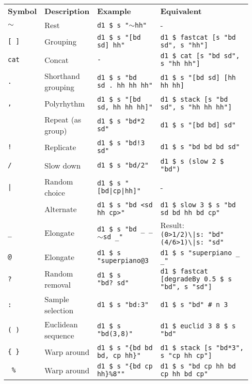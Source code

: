 \documentclass[8pt]{extarticle} %
\newcommand{\rest}{$\sim$}
\begin{document}
\begin{multicols}{2}
		{\small
		\begin{tabular}{L{0.1\linewidth} L{0.2\linewidth} L{0.27\linewidth} L{0.43\linewidth}}
			\small\bf Symbol & \small\bf Description & \small\bf Example & \small\bf Equivalent  \\ 
			\tt \rest   & Rest  & \tt d1 \$ s "\rest hh" & -	\\
			\tt [ ]   & Grouping & \tt d1 \$ s "[bd sd] hh" & \tt d1 \$ fastcat [s "bd sd", s "hh"] \\
			\tt cat & Concat & \tt - & \tt d1 \$ cat [s "bd sd", s "hh hh"] \\
			\tt . & Shorthand grouping & \tt d1 \$ s "bd sd\,.\,hh hh hh" & \tt d1 \$ s "[bd sd] [hh hh hh] \\
			\tt , & Polyrhythm  & \tt d1 \$ s "[bd sd, hh hh hh]" & \tt d1 \$ stack [s "bd sd", s "hh hh hh"] \\
			\tt * & Repeat (as group) & \tt d1 \$ s "bd*2 sd" & \tt d1 \$ s "[bd bd] sd" \\
			\tt ! & Replicate & \tt d1 \$ s "bd!3 sd" & \tt d1 \$ s "bd bd bd sd" \\
			\tt / & Slow down & \tt d1 \$ s "bd/2" & \tt d1 \$ s (slow 2 \$ "bd") \\
			\tt | & Random choice & \tt d1 \$ s "[bd|cp|hh]" & - \\
			\tt < > & Alternate & \tt d1 \$ s "bd <sd hh cp>" & \tt d1 \$ slow 3 \$ s "bd sd bd hh bd cp" \\
			\tt \_ & Elongate & \tt d1 \$ s "bd \_ \_ \rest sd \_" & Result: \tt (0>1/2)\textbackslash |s:\,"bd" (4/6>1)\textbackslash |s:\,"sd" \\
			\tt @ & Elongate & \tt d1 \$ s "superpiano@3 & \tt d1 \$ s "superpiano \_ \_" \\
			\tt ? & Random removal & \tt d1 \$ s "bd?\ sd" & \tt d1 \$ fastcat [degradeBy 0.5 \$ s "bd", s "sd"] \\
			\tt : & Sample selection & \tt d1 \$ s "bd:3" & \tt d1 \$ s "bd" \# n 3 \\
			\tt ( ) & Euclidean sequence & \tt d1 \$ s "bd(3,8)" & \tt d1 \$ euclid 3 8 \$ s "bd" \\
			\tt \{ \} & Warp around & \tt d1 \$ s "\{bd bd bd, cp hh\}"& \tt d1 \$ stack [s "bd*3", s "cp hh cp"] \\
			\tt { }\% & Warp around & \tt d1 \$ s "\{bd cp hh\}\%8""& \tt d1 \$ s "bd cp hh bd cp hh bd cp"
	\end{tabular}
	}
		

\end{multicols}
\end{document}
